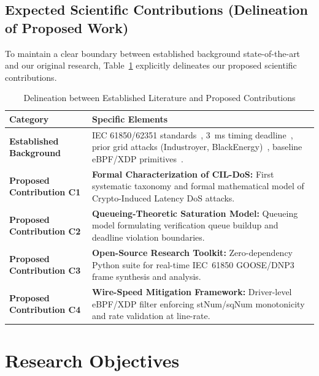 \documentclass[12pt,a4paper]{article}
\begin{document}
\subsection{Expected Scientific Contributions (Delineation of Proposed Work)}

To maintain a clear boundary between established background state-of-the-art and our original research, Table~\ref{tab:contributions_delineation} explicitly delineates our proposed scientific contributions.

\begin{table}[H]
\centering
\caption{Delineation between Established Literature and Proposed Contributions}
\label{tab:contributions_delineation}
\vspace{0.2cm}
\begin{tabularx}{\textwidth}{p{4.5cm} X}
\toprule
\textbf{Category} & \textbf{Specific Elements} \\
\midrule
\textbf{Established Background} & IEC 61850/62351 standards~\cite{iec61850, iec62351}, 3~ms timing deadline~\cite{iec61850}, prior grid attacks (Industroyer, BlackEnergy)~\cite{industroyer, ukraine2015}, baseline eBPF/XDP primitives~\cite{ebpf_iot}. \\
\midrule
\textbf{Proposed Contribution C1} & \textbf{Formal Characterization of CIL-DoS:} First systematic taxonomy and formal mathematical model of Crypto-Induced Latency DoS attacks. \\
\textbf{Proposed Contribution C2} & \textbf{Queueing-Theoretic Saturation Model:} Queueing model formulating verification queue buildup and deadline violation boundaries. \\
\textbf{Proposed Contribution C3} & \textbf{Open-Source Research Toolkit:} Zero-dependency Python suite for real-time IEC~61850 GOOSE/DNP3 frame synthesis and analysis. \\
\textbf{Proposed Contribution C4} & \textbf{Wire-Speed Mitigation Framework:} Driver-level eBPF/XDP filter enforcing stNum/sqNum monotonicity and rate validation at line-rate. \\
\bottomrule
\end{tabularx}
\end{table}

\section{Research Objectives}
\end{document}
